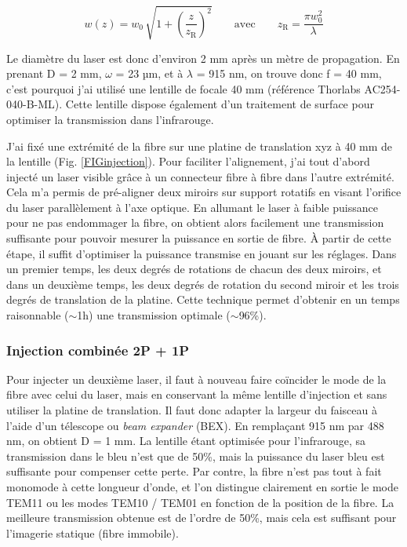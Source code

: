 $$
w(z) = w_0 \, \sqrt{ 1+ {\left( \frac{z}{z_\mathrm{R}} \right)}^2 } \qquad \text{avec} \qquad
z_\mathrm{R} = \frac{\pi w_0^2 }{\lambda}
$$

Le diamètre du laser est donc d'environ 2 mm après un mètre de propagation. En prenant D = 2 mm, $\omega$ = 23 µm, et à $\lambda$ = 915 nm, on trouve donc f = 40 mm, c'est pourquoi j'ai utilisé une lentille de focale 40 mm (référence Thorlabs AC254-040-B-ML). Cette lentille dispose également d'un traitement de surface pour optimiser la transmission dans l'infrarouge.


J'ai fixé une extrémité de la fibre sur une platine de translation xyz à 40 mm de la lentille (Fig. \ref{FIGinjection}). Pour faciliter l'alignement, j'ai tout d'abord injecté un laser visible grâce à un connecteur fibre à fibre dans l'autre extrémité. Cela m'a permis de pré-aligner deux miroirs sur support rotatifs en visant l'orifice du laser parallèlement à l'axe optique. En allumant le laser à faible puissance pour ne pas endommager la fibre, on obtient alors facilement une transmission suffisante pour pouvoir mesurer la puissance en sortie de fibre. À partir de cette étape, il suffit d'optimiser la puissance transmise en jouant sur les réglages. Dans un premier temps, les deux degrés de rotations de chacun des deux miroirs, et dans un deuxième temps, les deux degrés de rotation du second miroir et les trois degrés de translation de la platine. Cette technique permet d'obtenir en un temps raisonnable ($\sim$1h) une transmission optimale ($\sim$96\%).

\subsubsection{Injection combinée 2P + 1P}

Pour injecter un deuxième laser, il faut à nouveau faire coïncider le mode de la fibre avec celui du laser, mais en conservant la même lentille d'injection et sans utiliser la platine de translation. Il faut donc adapter la largeur du faisceau à l'aide d'un télescope ou \emph{beam expander} (BEX). En remplaçant 915 nm par 488 nm, on obtient D = 1 mm. La lentille étant optimisée pour l'infrarouge, sa transmission dans le bleu n'est que de 50\%, mais la puissance du laser bleu est suffisante pour compenser cette perte. Par contre, la fibre n'est pas tout à fait monomode à cette longueur d'onde, et l'on distingue clairement en sortie le mode TEM11 ou les modes TEM10 / TEM01 en fonction de la position de la fibre. La meilleure transmission obtenue est de l'ordre de 50\%, mais cela est suffisant pour l'imagerie statique (fibre immobile).


